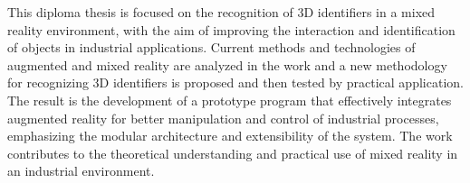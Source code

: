 This diploma thesis is focused on the recognition of 3D identifiers in a mixed reality environment, with the aim of improving the interaction and identification of objects in industrial applications. Current methods and technologies of augmented and mixed reality are analyzed in the work and a new methodology for recognizing 3D identifiers is proposed and then tested by practical application. The result is the development of a prototype program that effectively integrates augmented reality for better manipulation and control of industrial processes, emphasizing the modular architecture and extensibility of the system. The work contributes to the theoretical understanding and practical use of mixed reality in an industrial environment.